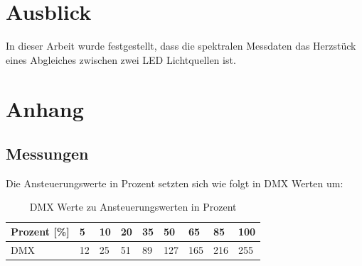 \documentclass[11pt]{scrartcl}
\begin{document}
\section{Ausblick}
In dieser Arbeit wurde festgestellt, dass die spektralen Messdaten das Herzstück eines Abgleiches zwischen
zwei LED Lichtquellen ist.
\clearpage

\renewcommand{\thesubsection}{\Alph{subsection}}
\section*{Anhang}

\subsection{Messungen}
Die Ansteuerungswerte in Prozent setzten sich wie folgt in DMX Werten um:
\begin{table}[H]
    \begin{tabularx}{\textwidth}{|l|X|X|X|X|X|X|X|X|}
        \hline
        Prozent [\%] & 5  & 10 & 20 & 35 & 50  & 65  & 85  & 100\\\hline
        DMX          & 12 & 25 & 51 & 89 & 127 & 165 & 216 & 255\\\hline
    \end{tabularx}
    \caption{DMX Werte zu Ansteuerungswerten in Prozent} \label{table:dmxToPercent}
\end{table}
\vspace{-.5cm}
\end{document}
